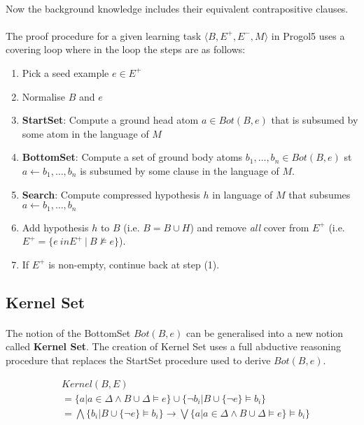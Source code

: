 \documentclass{article}
\theoremstyle{plain}
\theoremstyle{definition}
\begin{document}
\begin{multicols}{2}
\paragraph{} Now the background knowledge includes their equivalent contrapositive clauses.

\paragraph{} The proof procedure for a given learning task $\langle B, E^+, E^-, M\rangle$ in Progol5 uses a covering loop where in the loop the steps are as follows:

\begin{enumerate}
\item Pick a seed example $e \in E^+$
\item Normalise $B$ and $e$
\item \textbf{StartSet}: Compute a ground head atom $a \in Bot(B, e)$ that is subsumed by some atom in the language of $M$
\item \textbf{BottomSet}: Compute a set of ground body atoms $b_1, \dots, b_n \in Bot(B, e)$ st $a \leftarrow b_1,\dots,b_n$ is subsumed by some clause in the language of $M$.
\item \textbf{Search}: Compute compressed hypothesis $h$ in language of $M$ that subsumes $a \leftarrow b_1, \dots, b_n$
\item Add hypothesis $h$ to $B$ (i.e. $B = B \cup H$) and remove \textit{all} cover from $E^+$ (i.e. $E^+ = \{e \ in E^+\ |\ B \not\models e\}$).
\item If $E^+$ is non-empty, continue back at step (1).
\end{enumerate}

\subsection{Kernel Set}

\paragraph{} The notion of the BottomSet $Bot(B, e)$ can be generalised into a new notion called \textbf{Kernel Set}. The creation of Kernel Set uses a full abductive reasoning procedure that replaces the StartSet procedure used to derive $Bot(B, e)$. 

{\footnotesize
\begin{align*}
& Kernel(B, E) \\
&= \{a | a \in \Delta \land B \cup \Delta \models e\} \cup \{\lnot b_i | B \cup \{\lnot e\} \models b_i\} \\
&= \bigwedge \{b_i | B \cup \{\lnot e\} \models b_i\} \rightarrow \bigvee \{a | a \in \Delta \land B \cup \Delta \models e\} \models b_i\}
\end{align*}}


\end{multicols}
\end{document}
